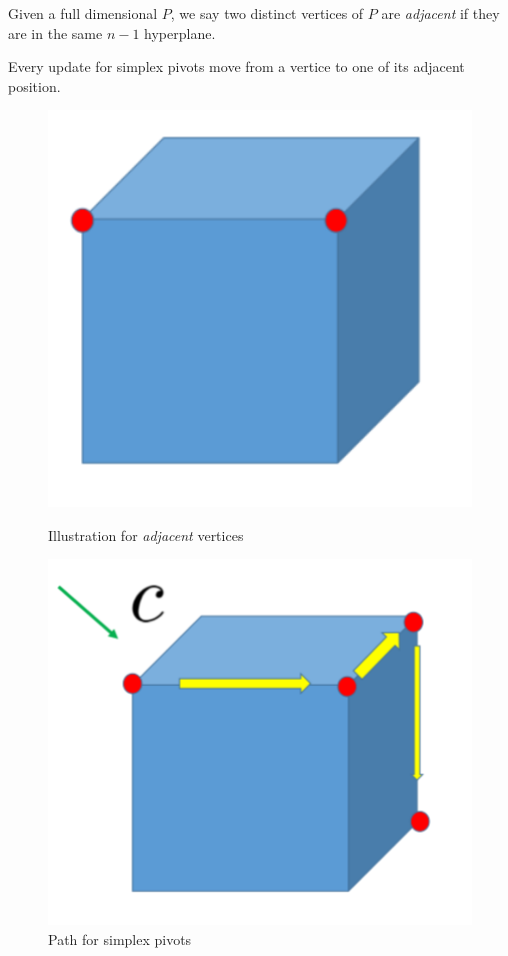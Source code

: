 \begin{definition}
Given a full dimensional $P$, we say two distinct vertices of $P$ are \emph{adjacent} if they are in the same $n-1$ hyperplane.
\end{definition}
\begin{remark}
Every update for simplex pivots move from a vertice to one of its adjacent position.
\end{remark}
\begin{figure}
\centering
\begin{minipage}[t]{0.48\textwidth}
\centering
\includegraphics[width=1\textwidth]{Second_lecture/p_4}
\caption{Illustration for \emph{adjacent} vertices}
\label{fig:2:2}
\end{minipage}
\begin{minipage}[t]{0.48\textwidth}
\centering
\includegraphics[width=1\textwidth]{Second_lecture/p_5}
\caption{Path for simplex pivots}
\label{fig:2:3}
\end{minipage}
\end{figure}



















